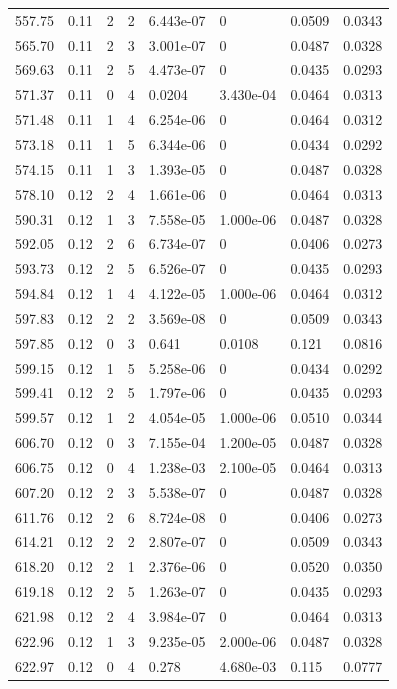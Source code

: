 \documentclass[preview]{standalone}
\begin{document}
{{{{{{\begin{tabular}{L{1.2cm}C{1.2cm} C{0.3cm}C{0.5cm} C{1.4cm}C{1.4cm} C{1.4cm}C{1.4cm}}
  557.75  &  0.11  & 2     &  2 &  6.443e-07  & 0  & 0.0509 &  0.0343   \\ 
  565.70  &  0.11  & 2     &  3 &  3.001e-07  & 0  & 0.0487 &  0.0328   \\ 
  569.63  &  0.11  & 2     &  5 &  4.473e-07  & 0  & 0.0435 &  0.0293   \\ 
  571.37  &  0.11  & 0     &  4 &  0.0204  & 3.430e-04  & 0.0464 &  0.0313   \\ 
  571.48  &  0.11  & 1     &  4 &  6.254e-06  & 0  & 0.0464 &  0.0312   \\ 
  573.18  &  0.11  & 1     &  5 &  6.344e-06  & 0  & 0.0434 &  0.0292   \\ 
  574.15  &  0.11  & 1     &  3 &  1.393e-05  & 0  & 0.0487 &  0.0328   \\ 
  578.10  &  0.12  & 2     &  4 &  1.661e-06  & 0  & 0.0464 &  0.0313   \\ 
  590.31  &  0.12  & 1     &  3 &  7.558e-05  & 1.000e-06  & 0.0487 &  0.0328   \\ 
  592.05  &  0.12  & 2     &  6 &  6.734e-07  & 0  & 0.0406 &  0.0273   \\ 
  593.73  &  0.12  & 2     &  5 &  6.526e-07  & 0  & 0.0435 &  0.0293   \\ 
  594.84  &  0.12  & 1     &  4 &  4.122e-05  & 1.000e-06  & 0.0464 &  0.0312   \\ 
  597.83  &  0.12  & 2     &  2 &  3.569e-08  & 0  & 0.0509 &  0.0343   \\ 
  597.85  &  0.12  & 0     &  3 &  0.641  & 0.0108  & 0.121 &  0.0816   \\ 
  599.15  &  0.12  & 1     &  5 &  5.258e-06  & 0  & 0.0434 &  0.0292   \\ 
  599.41  &  0.12  & 2     &  5 &  1.797e-06  & 0  & 0.0435 &  0.0293   \\ 
  599.57  &  0.12  & 1     &  2 &  4.054e-05  & 1.000e-06  & 0.0510 &  0.0344   \\ 
  606.70  &  0.12  & 0     &  3 &  7.155e-04  & 1.200e-05  & 0.0487 &  0.0328   \\ 
  606.75  &  0.12  & 0     &  4 &  1.238e-03  & 2.100e-05  & 0.0464 &  0.0313   \\ 
  607.20  &  0.12  & 2     &  3 &  5.538e-07  & 0  & 0.0487 &  0.0328   \\ 
  611.76  &  0.12  & 2     &  6 &  8.724e-08  & 0  & 0.0406 &  0.0273   \\ 
  614.21  &  0.12  & 2     &  2 &  2.807e-07  & 0  & 0.0509 &  0.0343   \\ 
  618.20  &  0.12  & 2     &  1 &  2.376e-06  & 0  & 0.0520 &  0.0350   \\ 
  619.18  &  0.12  & 2     &  5 &  1.263e-07  & 0  & 0.0435 &  0.0293   \\ 
  621.98  &  0.12  & 2     &  4 &  3.984e-07  & 0  & 0.0464 &  0.0313   \\ 
  622.96  &  0.12  & 1     &  3 &  9.235e-05  & 2.000e-06  & 0.0487 &  0.0328   \\ 
  622.97  &  0.12  & 0     &  4 &  0.278  & 4.680e-03  & 0.115 &  0.0777   \\ 
\hline 
\end{tabular} 

}}}}}}
\end{document}
